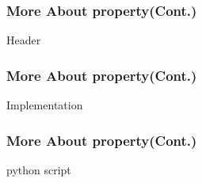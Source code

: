\begin{frame}
    \frametitle{More About property(Cont.)}
    \begin{block}{Header}
        \par\usebox{\createalgmorepropheader}
    \end{block}
\end{frame}
\begin{frame}
    \frametitle{More About property(Cont.)}
    \begin{block}{Implementation}
        \par\usebox{\createalgmorepropimpl}
    \end{block}
\end{frame}
\begin{frame}
    \frametitle{More About property(Cont.)}
    \begin{block}{python script}
        \par\usebox{\createalgmoreproppython}
    \end{block}
\end{frame}
